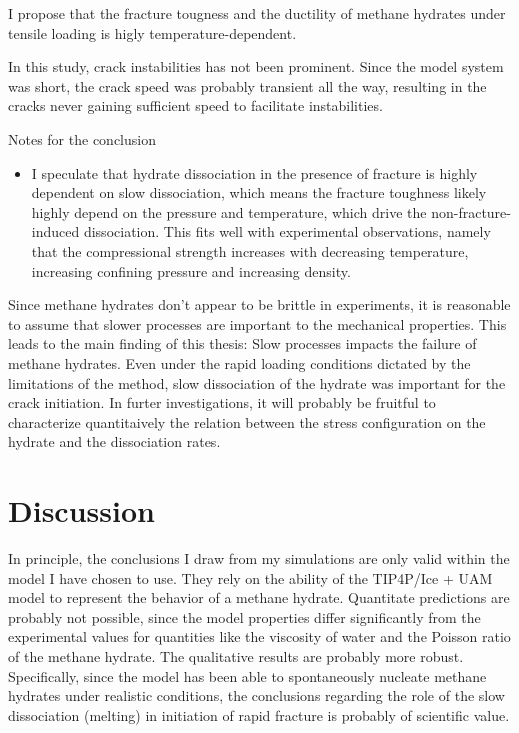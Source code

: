 I propose that the fracture tougness and the ductility of methane hydrates under tensile loading is higly temperature-dependent.

In this study, crack instabilities has not been prominent. Since the model system was short, the crack speed was probably transient all the way, resulting in the cracks never gaining sufficient speed to facilitate instabilities.	

Notes for the conclusion
\begin{itemize}
\item I speculate that hydrate dissociation in the presence of fracture is highly dependent on slow dissociation, which means the fracture toughness likely highly depend on the pressure and temperature, which drive the non-fracture-induced dissociation. This fits well with experimental observations, namely that the compressional strength increases with decreasing temperature, increasing confining pressure and increasing density.
\end{itemize}

Since methane hydrates don't appear to be brittle in experiments, it is reasonable to assume that slower processes are important to the mechanical properties. This leads to the main finding of this thesis: Slow processes impacts the failure of methane hydrates. Even under the rapid loading conditions dictated by the limitations of the method, slow dissociation of the hydrate was important for the crack initiation.
%
In furter investigations, it will probably be fruitful to characterize quantitaively the relation between the stress configuration on the hydrate and the dissociation rates. 

\section{Discussion}
In principle, the conclusions I draw from my simulations are only valid within the model I have chosen to use. They rely on the ability of the TIP4P/Ice + UAM model to represent the behavior of a methane hydrate. Quantitate predictions are probably not possible, since the model properties differ significantly from the experimental values for quantities like the viscosity of water and the Poisson ratio of the methane hydrate. The qualitative results are probably more robust. Specifically, since the model has been able to spontaneously nucleate methane hydrates under realistic conditions, the conclusions regarding the role of the slow dissociation (melting) in initiation of rapid fracture is probably of scientific value. 

